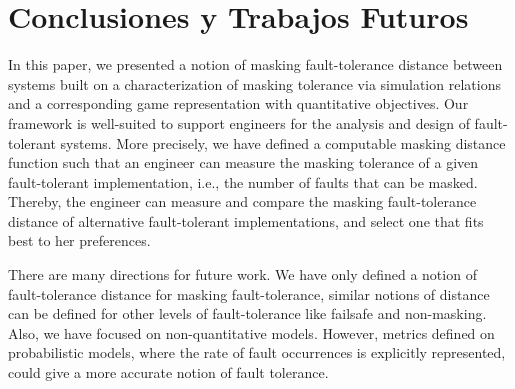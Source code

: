 \chapter{Conclusiones y Trabajos Futuros}
\label{cap:conclusiones}
In this paper, we  presented a notion of masking fault-tolerance 
distance between systems built on a characterization of masking 
tolerance via simulation relations and a corresponding game 
representation with quantitative objectives. 
Our framework is well-suited to support engineers for the analysis and 
design of fault-tolerant systems. More precisely, we have defined a 
computable masking distance function such that an engineer 
can measure the masking tolerance of a given 
fault-tolerant implementation, i.e., the number of faults that can be masked. 
Thereby, the engineer can measure and compare the masking fault-tolerance 
distance of alternative fault-tolerant implementations, and select one that 
fits best to her preferences.

There are many directions for future work.  We have only defined a
notion of fault-tolerance distance for masking fault-tolerance,
similar notions of distance can be defined for other levels of
fault-tolerance like failsafe and non-masking.  Also, we have focused
on non-quantitative models.  However, metrics defined on probabilistic
models, where the rate of fault occurrences is explicitly represented,
could give a more accurate notion of fault tolerance.